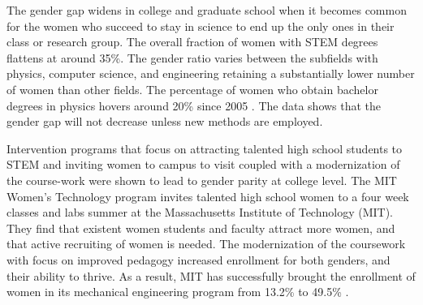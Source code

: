 \documentclass[utf8]{frontiersSCNS} %
\begin{document}
The gender gap widens in college and graduate school when it becomes common for the women who succeed to stay in science to end up the only ones in their class or research group.  The overall fraction of women with STEM degrees flattens at around 35\%.  The gender ratio varies between the subfields with physics, computer science, and engineering retaining a substantially lower number of women than other fields.  The percentage of women who obtain bachelor degrees in physics hovers around 20\% since 2005 \citep{apsData}. The data shows that the gender gap will not decrease unless new methods are employed.

Intervention programs that focus on attracting talented high school students to STEM and inviting women to campus to visit coupled with a modernization of the course-work were shown to lead to gender parity at college level.  The MIT Women's Technology program invites talented high school women to a four week classes and labs summer at the Massachusetts Institute of Technology (MIT). They find that existent women students and faculty attract more women, and that active recruiting of women is needed.  The modernization of the coursework with focus on improved pedagogy increased enrollment for both genders, and their ability to thrive. As a result, MIT has successfully brought the enrollment of women in its mechanical engineering program from 13.2\% to 49.5\% \citep{MITpress}. 
\end{document}
